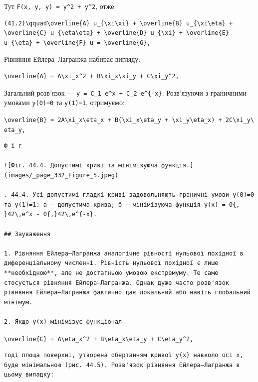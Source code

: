 \documentclass[
  ukrainian,
]{article}
\begin{document}
Тут
\texttt{F(x,\ y,\ y\textquotesingle{})\ =\ y\^{}2\ +\ y\textquotesingle{}\^{}2},
отже:

\begin{verbatim}
(41.2)\qquad\overline{A} u_{\xi\xi} + \overline{B} u_{\xi\eta} + \overline{C} u_{\eta\eta} + \overline{D} u_{\xi} + \overline{E} u_{\eta} + \overline{F} u = \overline{G},
\end{verbatim}

Рівняння Ейлера--Лагранжа набирає вигляду:

\begin{verbatim}
\overline{A} = A\xi_x^2 + B\xi_x\xi_y + C\xi_y^2,
\end{verbatim}

Загальний розв'язок ---
\texttt{y\ =\ C\_1\ e\^{}x\ +\ C\_2\ e\^{}\{-x\}}. Розв'язуючи з
граничними умовами \texttt{y(0)=0} та \texttt{y(1)=1}, отримуємо:

\texttt{\textbackslash{}overline\{B\}\ =\ 2A\textbackslash{}xi\_x\textbackslash{}eta\_x\ +\ B(\textbackslash{}xi\_x\textbackslash{}eta\_y\ +\ \textbackslash{}xi\_y\textbackslash{}eta\_x)\ +\ 2C\textbackslash{}xi\_y\textbackslash{}eta\_y,}

\begin{verbatim}
Ф і г

![Фіг. 44.4. Допустимі криві та мінімізуюча функція.](images/_page_332_Figure_5.jpeg)

. 44.4. Усі допустимі гладкі криві задовольняють граничні умови y(0)=0 та y(1)=1: а — допустима крива; б — мінімізуюча функція y(x) = 0{, }42\,e^x - 0{,}42\,e^{-x}.

## Зауваження

1. Рівняння Ейлера–Лагранжа аналогічне рівності нульової похідної в диференціальному численні. Рівність нульової похідної є лише **необхідною**, але не достатньою умовою екстремуму. Те саме стосується рівняння Ейлера–Лагранжа. Однак дуже часто розв'язок рівняння Ейлера–Лагранжа фактично дає локальний або навіть глобальний мінімум.

2. Якщо y(x) мінімізує функціонал
\end{verbatim}

\texttt{\textbackslash{}overline\{C\}\ =\ A\textbackslash{}eta\_x\^{}2\ +\ B\textbackslash{}eta\_x\textbackslash{}eta\_y\ +\ C\textbackslash{}eta\_y\^{}2,}

\begin{verbatim}
тоді площа поверхні, утворена обертанням кривої y(x) навколо осі x, буде мінімальною (рис. 44.5). Розв'язок рівняння Ейлера–Лагранжа в цьому випадку:
\end{verbatim}
\end{document}
